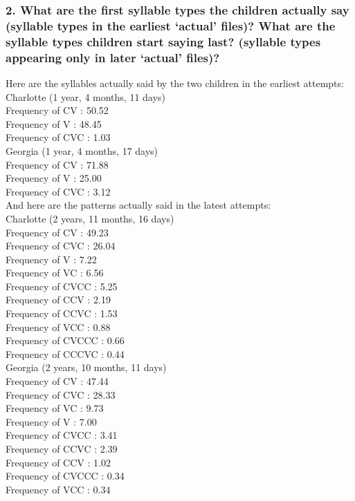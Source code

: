 \documentclass[a4paper,10pt]{article}
\newcommand{\br}{\\[10pt]}
\begin{document}
  \subsubsection*{2. What are the first syllable types the children actually say (syllable types in the earliest ‘actual’ files)? What are the syllable types children start saying last? (syllable types appearing only in later ‘actual’ files)?}
  Here are the syllables actually said by the two children in the earliest attempts:
  \br
  Charlotte (1 year, 4 months, 11 days)\\
  Frequency of CV :         50.52\\
  Frequency of V :          48.45\\
  Frequency of CVC :         1.03
  \br
  Georgia (1 year, 4 months, 17 days)\\
  Frequency of CV :         71.88\\
  Frequency of V :          25.00\\
  Frequency of CVC :         3.12
  \br
  And here are the patterns actually said in the latest attempts:
  \br
  Charlotte (2 years, 11 months, 16 days)\\
  Frequency of CV :         49.23\\
  Frequency of CVC :        26.04\\
  Frequency of V :           7.22\\
  Frequency of VC :          6.56\\
  Frequency of CVCC :        5.25\\
  Frequency of CCV :         2.19\\
  Frequency of CCVC :        1.53\\
  Frequency of VCC :         0.88\\
  Frequency of CVCCC :       0.66\\
  Frequency of CCCVC :       0.44
  \br
  Georgia (2 years, 10 months, 11 days)\\
  Frequency of CV :         47.44\\
  Frequency of CVC :        28.33\\
  Frequency of VC :          9.73\\
  Frequency of V :           7.00\\
  Frequency of CVCC :        3.41\\
  Frequency of CCVC :        2.39\\
  Frequency of CCV :         1.02\\
  Frequency of CVCCC :       0.34\\
  Frequency of VCC :         0.34
\end{document}
